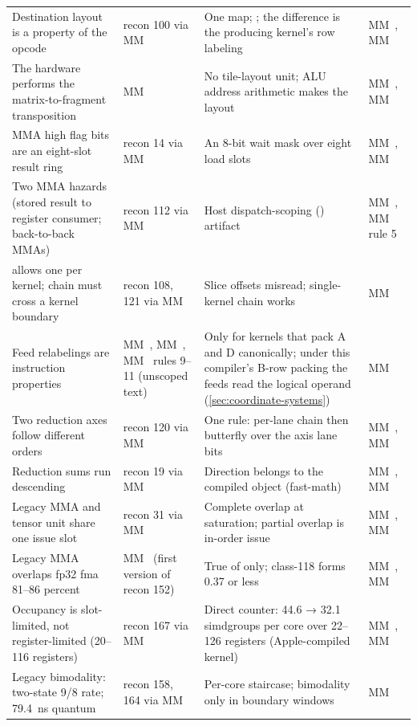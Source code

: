 \begin{xltabular}{\linewidth}{@{}>{\hsize}X>{\hsize}X>{\hsize}X>{\hsize}X@{}}
Destination layout is a property of the opcode & recon 100 via MM~ & One map; ; the difference is the
producing kernel's row labeling & MM~, MM~ \\
The hardware performs the matrix-to-fragment transposition & MM~ & No tile-layout unit; ALU address arithmetic makes the layout & MM~, MM~ \\
MMA high flag bits are an eight-slot result ring & recon 14 via MM~ & An 8-bit wait mask over eight load slots & MM~, MM~ \\
Two MMA hazards (stored result to register consumer; back-to-back MMAs) & recon 112 via MM~ & Host dispatch-scoping () artifact & MM~, MM~ rule 5 \\
 allows one  per kernel; chain must cross a
kernel boundary & recon 108, 121 via MM~ & Slice offsets misread; single-kernel chain works & MM~ \\
Feed relabelings are instruction properties & MM~, MM~, MM~ rules 9–11 (unscoped text) & Only for kernels that pack A and D canonically; under this
compiler's B-row packing the feeds read the logical operand (\cref{sec:coordinate-systems}) & MM~ \\
Two reduction axes follow different orders & recon 120 via MM~ & One rule: per-lane chain then butterfly over the axis lane bits & MM~, MM~ \\
Reduction sums run descending & recon 19 via MM~ & Direction belongs to the compiled object (fast-math) & MM~, MM~ \\
Legacy MMA and tensor unit share one issue slot & recon 31 via MM~ & Complete overlap at saturation; partial overlap is in-order issue & MM~, MM~ \\
Legacy MMA overlaps fp32 fma 81–86 percent & MM~ (first version of recon 152) & True of  only; class-118 forms
0.37 or less & MM~, MM~ \\
Occupancy is slot-limited, not register-limited (20–116 registers) & recon 167 via MM~ & Direct counter: 44.6 → 32.1 simdgroups per core over
22–126 registers (Apple-compiled kernel) & MM~, MM~ \\
Legacy bimodality: two-state 9/8 rate; 79.4~ns quantum & recon 158, 164 via MM~ & Per-core staircase; bimodality only in boundary windows & MM~ \\

\end{xltabular}
